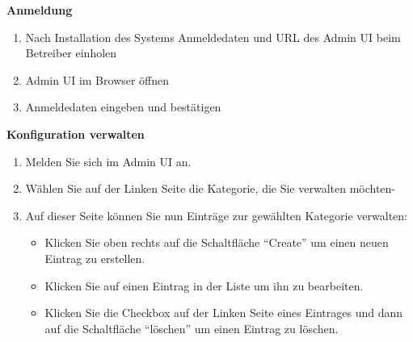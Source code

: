 \textbf{Anmeldung}

\begin{enumerate}
    \item Nach Installation des Systems Anmeldedaten und URL des Admin UI beim Betreiber einholen
    \item Admin UI im Browser öffnen
    \item Anmeldedaten eingeben und bestätigen
\end{enumerate}

\textbf{Konfiguration verwalten}
\begin{enumerate}
    \item Melden Sie sich im Admin UI an.
    \item Wählen Sie auf der Linken Seite die Kategorie, die Sie verwalten möchten-
    \item Auf dieser Seite können Sie nun Einträge zur gewählten Kategorie verwalten:
    \begin{itemize}
        \item Klicken Sie oben rechts auf die Schaltfläche ``Create'' um einen neuen Eintrag zu erstellen.
        \item Klicken Sie auf einen Eintrag in der Liste um ihn zu bearbeiten.
        \item Klicken Sie die Checkbox auf der Linken Seite eines Eintrages und dann auf die Schaltfläche ``löschen'' um einen Eintrag zu löschen.
    \end{itemize}
\end{enumerate}

